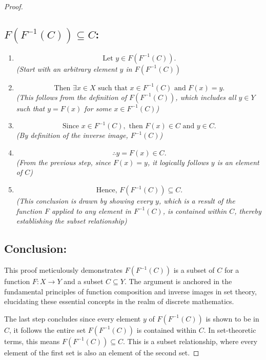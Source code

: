 \documentclass[12pt]{article}
\begin{document}
\begin{proof}
\subsection*{ \( F(F^{-1}(C)) \subseteq C \):}
\begin{enumerate}
    \item 
    \[
    \text{Let } y \in F(F^{-1}(C)).
    \]
    \textit{(Start with an arbitrary element \( y \) in \( F(F^{-1}(C)) \)}
    
    \item 
    \[
    \text{Then } \exists x \in X \text{ such that } x \in F^{-1}(C) \text{ and } F(x) = y.
    \]
    \textit{(This follows from the definition of \( F(F^{-1}(C)) \), which includes all \( y \in Y \) such that \( y = F(x) \) for some \( x \in F^{-1}(C) \))}
  
    \item 
    \[
    \text{Since } x \in F^{-1}(C), \text{ then } F(x) \in C \text{ and } y \in C.
    \]
    \textit{(By definition of the inverse image, \( F^{-1}(C) \))}
    
    \item 
    \[
    \therefore y = F(x) \in C.
    \]
    \textit{(From the previous step, since \( F(x) = y \), it logically follows \( y \) is an element of \( C \))}
    
    \item 
    \[
    \text{Hence, } F(F^{-1}(C)) \subseteq C.
    \]
    \textit{(This conclusion is drawn by showing every \( y \), which is a result of the function \( F \) applied to any element in \( F^{-1}(C) \), is contained within \( C \), thereby establishing the subset relationship)} 
\end{enumerate}

\subsection*{Conclusion:}
This proof meticulously demonstrates \( F(F^{-1}(C)) \) is a subset of \( C \) for a function \( F: X \to Y \) and a subset \( C \subseteq Y \). The argument is anchored in the fundamental principles of function composition and inverse images in set theory, elucidating these essential concepts in the realm of discrete mathematics.

The last step concludes since every element \( y \) of \( F(F^{-1}(C)) \) is shown to be in \( C \), it follows the entire set \( F(F^{-1}(C)) \) is contained within \( C \). In set-theoretic terms, this means \( F(F^{-1}(C)) \subseteq C \). This is a subset relationship, where every element of the first set is also an element of the second set.

\end{proof}
\end{document}
